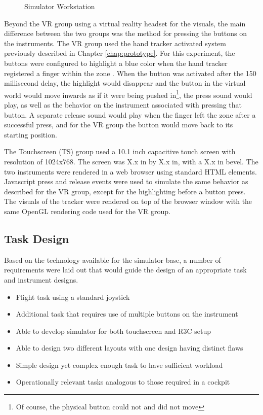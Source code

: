 \begin{figure}
    \caption{Simulator Workstation}
    \label{fig:de_simgroups}
\end{figure}

Beyond the VR group using a virtual reality headset for the visuals, the main difference between the two groups was the method for pressing the buttons on the instruments.
The VR group used the hand tracker activated system previously described in Chapter \autoref{chap:prototype}.
For this experiment, the buttons were configured to highlight a blue color when the hand tracker registered a finger within the zone .
When the button was activated after the 150 millisecond delay, the highlight would disappear and the button in the virtual world would move inwards as if it were being pushed in\footnote{Of course, the physical button could not and did not move}, the press sound would play, as well as the behavior on the instrument associated with pressing that button.
A separate release sound would play when the finger left the zone after a successful press, and for the VR group the button would move back to its starting position.

The Touchscreen (TS) group used a 10.1 inch capacitive touch screen with resolution of 1024x768.
The screen was X.x in by X.x in, with a X.x in bevel.
The two instruments were rendered in a web browser using standard HTML elements.
Javascript press and release events were used to simulate the same behavior as described for the VR group, except for the highlighting before a button press.
The visuals of the tracker were rendered on top of the browser window with the same OpenGL rendering code used for the VR group.


\subsection{Task Design}

Based on the technology available for the simulator base, a number of requirements were laid out that would guide the design of an appropriate task and instrument designs.

\begin{itemize}
    \item Flight task using a standard joystick
    \item Additional task that requires use of multiple buttons on the instrument
    \item Able to develop simulator for both touchscreen and R3C setup 
    \item Able to design two different layouts with one design having distinct flaws
    \item Simple design yet complex enough task to have sufficient workload
    \item Operationally relevant tasks analogous to those required in a cockpit
\end{itemize}

